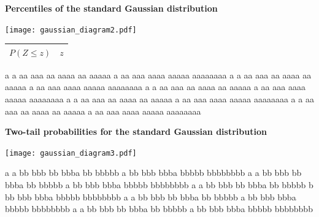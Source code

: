 \documentclass[a4paper]{article}
\begin{document}
\begin{minipage}[t]{7cm}
  \begin{center}
    {\Large\bf Percentiles of the standard Gaussian distribution}
    
    \texttt{[image: gaussian\_diagram2.pdf]}


    \begin{tabular}{l|r}\hline
      $P\left(Z\leqslant z\right)$ & $z$\\
      \hline
      
      \hline
    \end{tabular}
  \end{center}
  
a a aa aaa aa aaaa aa aaaaa a aa aaa aaaa aaaaa aaaaaaaa 
a a aa aaa aa aaaa aa aaaaa a aa aaa aaaa aaaaa aaaaaaaa 
a a aa aaa aa aaaa aa aaaaa a aa aaa aaaa aaaaa aaaaaaaa 
a a aa aaa aa aaaa aa aaaaa a aa aaa aaaa aaaaa aaaaaaaa 
a a aa aaa aa aaaa aa aaaaa a aa aaa aaaa aaaaa aaaaaaaa 
\end{minipage}\hfill
\begin{minipage}[t]{7cm}
  \begin{center}
    {\Large\bf Two-tail probabilities for the standard Gaussian distribution}

    \texttt{[image: gaussian\_diagram3.pdf]}
  \end{center}
a a bb bbb bb bbba bb bbbbb a bb bbb bbba bbbbb bbbbbbbb 
a a bb bbb bb bbba bb bbbbb a bb bbb bbba bbbbb bbbbbbbb 
a a bb bbb bb bbba bb bbbbb b bb bbb bbba bbbbb bbbbbbbb 
a a bb bbb bb bbba bb bbbbb a bb bbb bbba bbbbb bbbbbbbb 
a a bb bbb bb bbba bb bbbbb a bb bbb bbba bbbbb bbbbbbbb 
\end{minipage}



\end{document}
